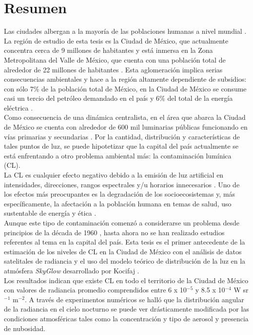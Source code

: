 \chapter{Resumen}

Las ciudades albergan a la mayoría de las poblaciones humanas a nivel mundial \citep{Pedersen2018}. La región de estudio de esta tesis es la Ciudad de México, que actualmente concentra cerca de 9 millones de habitantes \citep{INEGI2015} y está inmersa en la Zona Metropolitana del Valle de México, que cuenta con una población total de alrededor de 22 millones de habitantes \citep{OCDE2015}. Esta aglomeración implica serias consecuencias ambientales y hace a la región altamente dependiente de subsidios: con sólo 7\% de la población total de México, en la Ciudad de México se consume casi un tercio del petróleo demandado en el país y 6\% del total de la energía eléctrica \citep{SENER2013, Ezcurra2011}.\\

Como consecuencia de una dinámica centralista, en el área que abarca la Ciudad de México se cuenta con alrededor de 600 mil luminarias públicas funcionando en vías primarias y secundarias \citep{INFO2019}. Por la cantidad, distribución y características de tales puntos de luz, se puede hipotetizar que la capital del país actualmente se está enfrentando a otro problema ambiental más: la contaminación lumínica (CL).\\

La CL es cualquier efecto negativo debido a la emisión de luz artificial en intensidades, direcciones, rangos espectrales y/u horarios innecesarios \citep{AtlasREPSA}. Uno de los efectos más preocupantes es la degradación de los socioecosistemas y, más específicamente, la afectación a la población humana en temas de salud, uso sustentable de energía y ética \citep{AtlasREPSA, LibroCL, Stone2017}.\\

Aunque este tipo de contaminación comenzó a considerarse un problema desde principios de la década de 1960 \citep{LibroCL}, hasta ahora no se han realizado estudios referentes al tema en la capital del país. Esta tesis es el primer antecedente de la estimación de los niveles de CL en la Ciudad de México con el análisis de datos satelitales de radiancia y el uso del modelo teórico de distribución de la luz en la atmósfera \textit{SkyGlow} desarrollado por Kocifaj \citep{Kocifaj2007}.\\

Los resultados indican que existe CL en todo el territorio de la Ciudad de México con valores de radiancia promedio comprendidos entre 6 x 10$^{-5}$ y 8.5 x 10$^{-4}$ W sr$^{-1}$ m$^{-2}$. A través de experimentos numéricos se halló que la distribución angular de la radiancia en el cielo nocturno se puede ver drásticamente modificada por las condiciones atmosféricas tales como la concentración y tipo de aerosol y presencia de nubosidad.\\

